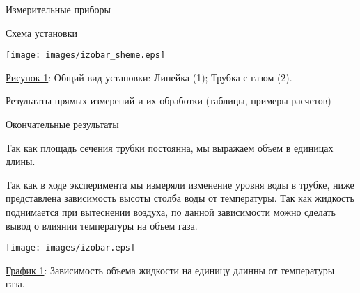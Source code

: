 \documentclass[12pt]{article}
\begin{document}
    \begin{point}{Измерительные приборы}
        \devices
    \end{point}

    \begin{point}{Схема установки}
        \par
        \begin{center}
        \texttt{[image: images/izobar\_sheme.eps]}
        \end{center}
        \begin{center}
        \underline{Рисунок 1}: Общий вид установки: Линейка (1);
            Трубка с газом (2).
        \end{center}
    \end{point}

    \begin{point}{Результаты прямых измерений и их обработки (таблицы, примеры расчетов)}
        \izmerenia
    \end{point}

    \begin{point}{Окончательные результаты}
        \par Так как площадь сечения трубки постоянна, мы выражаем объем в единицах длины.
        \par Так как в ходе эксперимента мы измеряли изменение уровня воды в трубке, ниже представлена зависимость высоты столба воды от температуры. Так как жидкость поднимается при вытеснении воздуха, по данной зависимости можно сделать вывод о влиянии температуры на объем газа.
        \par
        \texttt{[image: images/izobar.eps]}
        \begin{center}
        \underline{График 1}: Зависимость объема жидкости на единицу длинны от температуры газа.
        \end{center}
        \par
        \end{point}
\end{document}
